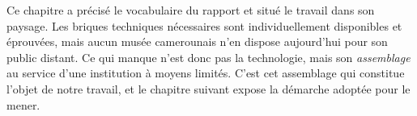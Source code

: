 \conclchap

Ce chapitre a précisé le vocabulaire du rapport et situé le travail dans son
paysage. Les briques techniques nécessaires sont individuellement disponibles et
éprouvées, mais aucun musée camerounais n'en dispose aujourd'hui pour son public
distant. Ce qui manque n'est donc pas la technologie, mais son
\emph{assemblage} au service d'une institution à moyens limités. C'est cet
assemblage qui constitue l'objet de notre travail, et le chapitre suivant expose
la démarche adoptée pour le mener.
